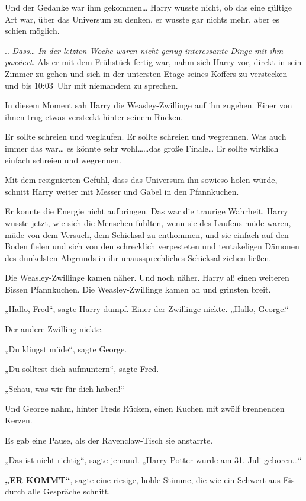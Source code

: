 {Und der Gedanke war ihm gekommen… Harry wusste nicht, ob das eine gültige Art war, über das Universum zu denken, er wusste gar nichts mehr, aber es schien möglich.

.. \emph{Dass… In der letzten Woche waren nicht genug interessante Dinge mit ihm passiert.} Als er mit dem Frühstück fertig war, nahm sich Harry vor, direkt in sein Zimmer zu gehen und sich in der untersten Etage seines Koffers zu verstecken und bis 10:03~Uhr mit niemandem zu sprechen.

In diesem Moment sah Harry die Weasley-Zwillinge auf ihn zugehen. Einer von ihnen trug etwas versteckt hinter seinem Rücken.

Er sollte schreien und weglaufen. Er sollte schreien und wegrennen. Was auch immer das war… es könnte sehr wohl……das große Finale… Er sollte wirklich einfach schreien und wegrennen.

Mit dem resignierten Gefühl, dass das Universum ihn sowieso holen würde, schnitt Harry weiter mit Messer und Gabel in den Pfannkuchen.

Er konnte die Energie nicht aufbringen. Das war die traurige Wahrheit. Harry wusste jetzt, wie sich die Menschen fühlten, wenn sie des Laufens müde waren, müde von dem Versuch, dem Schicksal zu entkommen, und sie einfach auf den Boden fielen und sich von den schrecklich verpesteten und tentakeligen Dämonen des dunkelsten Abgrunds in ihr unaussprechliches Schicksal ziehen ließen.

Die Weasley-Zwillinge kamen näher. Und noch näher. Harry aß einen weiteren Bissen Pfannkuchen. Die Weasley-Zwillinge kamen an und grinsten breit.

„Hallo, Fred“, sagte Harry dumpf. Einer der Zwillinge nickte. „Hallo, George.“

Der andere Zwilling nickte.

„Du klingst müde“, sagte George.

„Du solltest dich aufmuntern“, sagte Fred.

„Schau, was wir für dich haben!“

Und George nahm, hinter Freds Rücken, einen Kuchen mit zwölf brennenden Kerzen.

Es gab eine Pause, als der Ravenclaw-Tisch sie anstarrte.

„Das ist nicht richtig“, sagte jemand. „Harry Potter wurde am 31. Juli geboren…“

\textbf{„ER KOMMT“}, sagte eine riesige, hohle Stimme, die wie ein Schwert aus Eis durch alle Gespräche schnitt.

}
